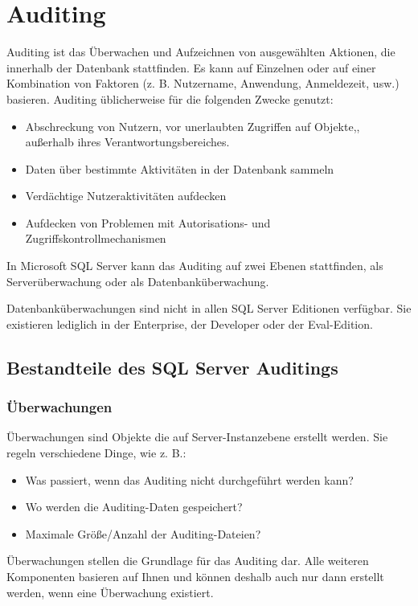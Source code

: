   \chapter{Auditing}
    \setcounter{page}{1}
    \minitoc
\newpage
      Auditing ist das \"Uberwachen und Aufzeichnen von ausgew\"ahlten Aktionen,
      die innerhalb der Datenbank stattfinden. Es kann auf Einzelnen oder auf
      einer Kombination von Faktoren (z. B. Nutzername, Anwendung, Anmeldezeit,
      usw.) basieren. Auditing \"ublicherweise f\"ur die folgenden Zwecke
      genutzt:
      \begin{itemize}
        \item Abschreckung von Nutzern, vor unerlaubten Zugriffen auf Objekte,,
        au\ss erhalb ihres Verantwortungsbereiches.
        \item Daten \"uber bestimmte Aktivit\"aten in der Datenbank sammeln
        \item Verd\"achtige Nutzeraktivit\"aten aufdecken
        \item Aufdecken von Problemen mit Autorisations- und Zugriffskontrollmechanismen
      \end{itemize}
      In Microsoft SQL Server kann das Auditing auf zwei Ebenen stattfinden, als
      Serverüberwachung oder als Datenbanküberwachung.
      \begin{merke}
        Datenbanküberwachungen sind nicht in allen SQL Server Editionen
        verfügbar. Sie existieren lediglich in der Enterprise, der Developer
        oder der Eval-Edition.
      \end{merke}
    \section{Bestandteile des SQL Server Auditings}
      \subsection{Überwachungen}
        Überwachungen sind Objekte die auf Server-Instanzebene erstellt
        werden. Sie regeln verschiedene Dinge, wie z. B.:
        \begin{itemize}
          \item Was passiert, wenn das Auditing nicht durchgeführt werden
          kann?
          \item Wo werden die Auditing-Daten gespeichert?
          \item Maximale Größe/Anzahl der Auditing-Dateien?
        \end{itemize}
        Überwachungen stellen die Grundlage für das Auditing dar. Alle
        weiteren Komponenten basieren auf Ihnen und können deshalb auch nur
        dann erstellt werden, wenn eine Überwachung existiert.
